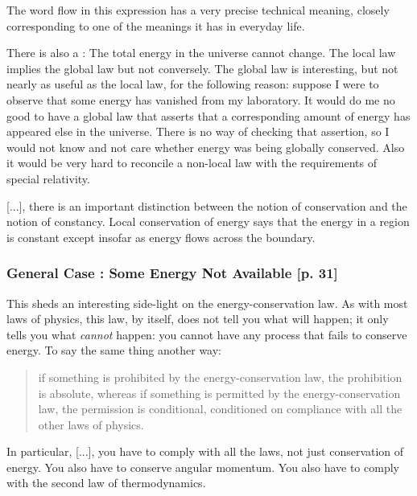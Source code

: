 The word flow in this expression has a very precise technical meaning, closely corresponding to one of the meanings it has in everyday life.

There is also a : The total energy in the universe cannot change. The local law implies the global law but not conversely. The global law is interesting, but not nearly as useful as the local law, for the following reason: suppose I were to observe that some energy has vanished from my laboratory. It would do me no good to have a global law that asserts that a corresponding amount of energy has appeared  else in the universe. There is no way of checking that assertion, so I would not know and not care whether energy was being globally conserved. Also it would be very hard to reconcile a non-local law with the requirements of special relativity.

[...], there is an important distinction between the notion of conservation and the notion of constancy. Local conservation of energy says that the energy in a region is constant except insofar as energy flows across the boundary.


\subsubsection{General Case : Some Energy Not Available [p. 31]}
%
This sheds an interesting side-light on the energy-conservation law. As with most laws of physics, this law, by itself, does not tell you what will happen; it only tells you what \emph{cannot} happen: you cannot have any process that fails to conserve energy. To say the same thing another way: 
%
\begin{quotation}
  if something is prohibited by the energy-conservation law, the prohibition is absolute, whereas if something is permitted by the energy-conservation law, the permission is conditional, conditioned on compliance with all the other laws of physics. 
\end{quotation}
%
In particular, [...], you have to comply with all the laws, not just conservation of energy. You also have to conserve angular momentum. You also have to comply with the second law of thermodynamics.
